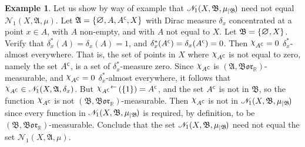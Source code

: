 \documentclass[
twoside=true,
paper=letter,
fontsize=9pt,
pagesize=auto,
leqno,
openany,
headsepline,
overfullrule,
]{scrbook}
\theoremstyle{plain}
\theoremstyle{plain}
\theoremstyle{definition}
\newtheorem{example}[thm]{Example}
\theoremstyle{bfnoteitalic}
\theoremstyle{bfnoteroman}
\newcommand{\sigalg}[1]{\mathfrak{#1}}
\newcommand{\cali}[1]{\mathscr{#1}}
\newcommand{\borel}{\mathfrak{Bor}}
\newcommand{\charfunction}[1]{\mathop{{\raisebox{2pt}{$\chi$}}_{#1}}}
\newcommand{\restrictedto}[1]{_{\lvert#1}\kern-1.5pt}
\newcommand{\mtset}{\hbox{\large{$\varnothing$}}}
\newcommand{\comp}{^{\hbox{\tiny{$\mathsf C$}}}}
\newcommand{\preimage}[1]{\mathop{#1^{\leftarrow}}}
\newcommand{\R}{\mathbb{R}}
\newcommand{\sigmaalgebra}{\sigalg{A}}
\newcommand{\sigmaalgebraii}{\sigalg{B}}
\newcommand{\measurespace}{X}
\newcommand{\mspaceelt}{x}
\newcommand{\measure}{\mu}
\newcommand{\diracmeasure}[1]{\delta_{#1}}
\newcommand{\seti}{A}
\begin{document}
\begin{example}\label{unequal_kernel}
Let us show by way of example that 
$\cali{N}_1(\measurespace, \sigmaalgebraii, \measure\restrictedto{\sigmaalgebraii})$
need not equal 
$\cali{N}_1(\measurespace, \sigmaalgebra, \measure)$.
Let 
$\sigmaalgebra = 
\{ 
\mtset,
\seti,
\seti\comp,
\measurespace
\}$
with Dirac measure $\diracmeasure{\mspaceelt}$ concentrated at a point $\mspaceelt\in\seti$, with $\seti$ non-empty, and with $\seti$ not equal to $\measurespace$. 
Let
$\sigmaalgebraii = 
\{ 
\mtset,
\measurespace
\}$.  Verify that 
$\diracmeasure{\mspaceelt}^*(\seti)=\diracmeasure{\mspaceelt}(\seti)=1$, and
$\diracmeasure{\mspaceelt}^*(\seti\comp)=\diracmeasure{\mspaceelt}(\seti\comp)=0$.
Then $\charfunction{\seti\comp} = 0$ $\diracmeasure{\mspaceelt}^*$-almost everywhere. 
That is, the set of points in $\measurespace$ where $\charfunction{\seti\comp}$ is not equal to zero, namely the set 
$\seti\comp$, is a set of $\diracmeasure{\mspaceelt}^*$-measure zero.
Since $\charfunction{\seti\comp}$ is $(\sigmaalgebra,\borel_\R)$\hyp{}measurable, 
and
$\charfunction{\seti\comp} = 0$ $\diracmeasure{\mspaceelt}^*$-almost everywhere,
it follows that
$\charfunction{\seti\comp}\in
\cali{N}_1(\measurespace, \sigmaalgebra,\diracmeasure{\mspaceelt})$.
But $\preimage{{\charfunction{\seti\comp}}}{(\{1\})} =\seti\comp$, 
and the set $\seti\comp$ is not in $\sigmaalgebraii$, 
so the function 
$\charfunction{\seti\comp}$ is not  $(\sigmaalgebraii,\borel_\R)$\hyp{}measurable. Then 
$\charfunction{\seti\comp}$
is not in 
$\cali{N}_1(\measurespace, \sigmaalgebraii, \measure\restrictedto{\sigmaalgebraii})$
since every function in 
$\cali{N}_1(\measurespace, \sigmaalgebraii, \measure\restrictedto{\sigmaalgebraii})$
is required, by definition, to be 
$(\sigmaalgebraii,\borel_\R)$\hyp{}measurable.
Conclude that the set
$\cali{N}_1(\measurespace, \sigmaalgebraii, \measure\restrictedto{\sigmaalgebraii})$
need not equal the set
$\cali{N}_1(\measurespace, \sigmaalgebra, \measure)$.
\end{example}
\end{document}
